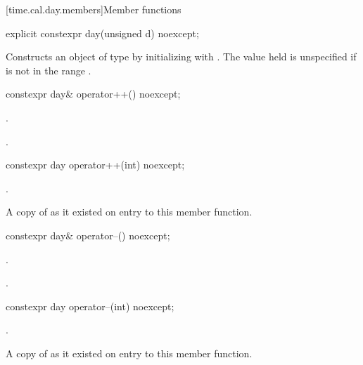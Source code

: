 [time.cal.day.members]{Member functions}

%
\begin{itemdecl}
explicit constexpr day(unsigned d) noexcept;
\end{itemdecl}

\begin{itemdescr}
\pnum
\effects
Constructs an object of type  by
initializing  with .
The value held is unspecified if  is not in the range .
\end{itemdescr}

%
\begin{itemdecl}
constexpr day& operator++() noexcept;
\end{itemdecl}

\begin{itemdescr}
\pnum
\effects {}.

\pnum
\returns {}.
\end{itemdescr}

%
\begin{itemdecl}
constexpr day operator++(int) noexcept;
\end{itemdecl}

\begin{itemdescr}
\pnum
\effects {}.

\pnum
\returns A copy of  as it existed on entry to this member function.
\end{itemdescr}

%
\begin{itemdecl}
constexpr day& operator--() noexcept;
\end{itemdecl}

\begin{itemdescr}
\pnum
\effects {}.

\pnum
\returns {}.
\end{itemdescr}

%
\begin{itemdecl}
constexpr day operator--(int) noexcept;
\end{itemdecl}

\begin{itemdescr}
\pnum
\effects {}.

\pnum
\returns A copy of  as it existed on entry to this member function.
\end{itemdescr}

